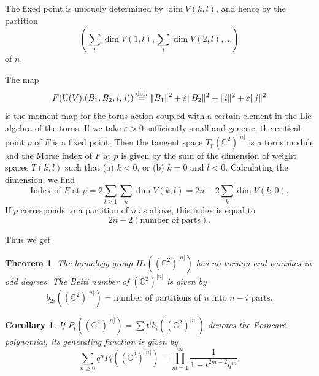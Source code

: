 \documentclass[12pt]{amsart}
\newtheorem{Theorem}[equation]{Theorem}
\newtheorem{Corollary}[equation]{Corollary}
\theoremstyle{definition}
\theoremstyle{remark}
\numberwithin{equation}{section}
\newcommand{\defeq}{\overset{\operatorname{\scriptstyle def.}}{=}}
\newcommand{\C}{{\mathbb C}}
\newcommand{\U}{\operatorname{\rm U}}
\newcommand{\Hilb}[2]{{#1}^{\lbrack{#2}\rbrack}} %
\newcommand{\Hilbn}[1]{\Hilb{#1}{n}}
\begin{document}
The fixed point is uniquely determined by $\dim V(k,l)$, and hence by
the partition
\begin{equation*}
  (\sum_l \dim V(1,l), \sum_l \dim V(2,l), \dots)
\end{equation*}
of $n$.

The map
\begin{equation*}
  F(\U(V).(B_1, B_2, i, j)) \defeq
  \|B_1\|^2 + \varepsilon \|B_2\|^2 + \| i\|^2 + \varepsilon \|j\|^2
\end{equation*}
is the moment map for the torus action coupled with a certain element
in the Lie algebra of the torus.
If we take $\varepsilon > 0$ sufficiently small and generic,
the critical point $p$ of $F$ is a fixed point.
Then the tangent space $T_p\Hilbn{(\C^2)}$ is a torus module and
the Morse index of $F$ at $p$ is given by the sum of the dimension of
weight spaces $T(k,l)$ such that
(a) $k < 0$, or (b) $k = 0$ and $l < 0$.
Calculating the dimension, we find
\begin{equation*}
  \text{Index of $F$ at $p$}
  = 2 \sum_{l \ge 1} \sum_k \dim V(k,l)
  = 2n - 2\sum_k \dim V(k,0).
\end{equation*}
If $p$ corresponds to a partition of $n$ as above, this index is equal
to
\begin{equation*}
  2n - 2(\text{number of parts}).
\end{equation*}

Thus we get
\begin{Theorem}
  The homology group $H_*(\Hilbn{(\C^2)})$ has no torsion and vanishes
  in odd degrees.
  The Betti number of $\Hilbn{(\C^2)}$ is given by
  \begin{equation*}
    b_{2i}(\Hilbn{(\C^2)}) = \text{number of partitions of $n$ into
      $n - i$ parts}.
  \end{equation*}
\end{Theorem}

\begin{Corollary}
  If $P_t(\Hilbn{(\C^2)}) = \sum t^i b_i(\Hilbn{(\C^2)})$ denotes the
  Poincar\`e polynomial, its generating function is given by
  \begin{equation*}
    \sum_{n\ge 0} q^n P_t(\Hilbn{(\C^2)})
    = \prod_{m=1}^\infty \frac 1{1 - t^{2m - 2}q^m}.
  \end{equation*}
\end{Corollary}
\end{document}
